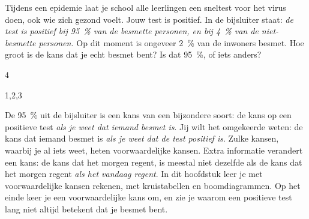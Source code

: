 %


\begin{probleem}
Tijdens een epidemie laat je school alle leerlingen een sneltest voor het virus doen, ook wie zich gezond voelt. Jouw test is positief. In de bijsluiter staat: \textit{de test is positief bij 95~\% van de besmette personen, en bij 4~\% van de niet-besmette personen.} Op dit moment is ongeveer 2~\% van de inwoners besmet. Hoe groot is de kans dat je echt besmet bent? Is dat 95~\%, of iets anders?
\end{probleem}

\begin{alleenvoor}{4}
\end{alleenvoor}
\begin{alleenvoor}{1,2,3}
\end{alleenvoor}

De 95~\% uit de bijsluiter is een kans van een bijzondere soort: de kans op een positieve test \textit{als je weet dat iemand besmet is}. Jij wilt het omgekeerde weten: de kans dat iemand besmet is \textit{als je weet dat de test positief is}. Zulke kansen, waarbij je al iets weet, heten voorwaardelijke kansen. Extra informatie verandert een kans: de kans dat het morgen regent, is meestal niet dezelfde als de kans dat het morgen regent \textit{als het vandaag regent}. In dit hoofdstuk leer je met voorwaardelijke kansen rekenen, met kruistabellen en boomdiagrammen. Op het einde keer je een voorwaardelijke kans om, en zie je waarom een positieve test lang niet altijd betekent dat je besmet bent.

